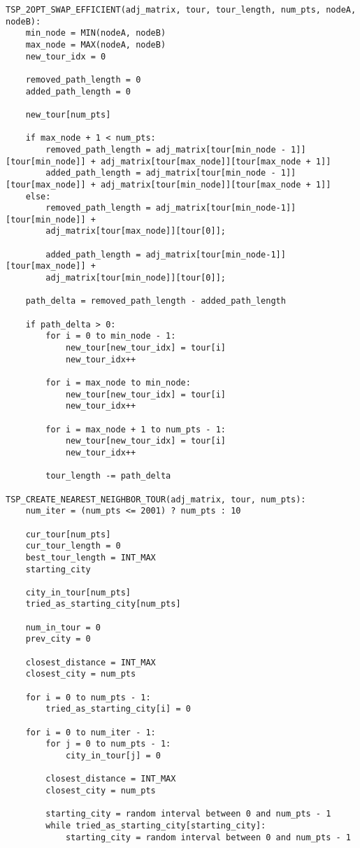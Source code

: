 \documentclass[../report/main.tex]{subfiles}
\begin{document}
\begin{verbatim}
TSP_2OPT_SWAP_EFFICIENT(adj_matrix, tour, tour_length, num_pts, nodeA, nodeB):
    min_node = MIN(nodeA, nodeB)
    max_node = MAX(nodeA, nodeB)
    new_tour_idx = 0

    removed_path_length = 0
    added_path_length = 0

    new_tour[num_pts]

    if max_node + 1 < num_pts:
        removed_path_length = adj_matrix[tour[min_node - 1]][tour[min_node]] + adj_matrix[tour[max_node]][tour[max_node + 1]]
        added_path_length = adj_matrix[tour[min_node - 1]][tour[max_node]] + adj_matrix[tour[min_node]][tour[max_node + 1]]
    else:
        removed_path_length = adj_matrix[tour[min_node-1]][tour[min_node]] + 
        adj_matrix[tour[max_node]][tour[0]];

        added_path_length = adj_matrix[tour[min_node-1]][tour[max_node]] + 
        adj_matrix[tour[min_node]][tour[0]];

    path_delta = removed_path_length - added_path_length

    if path_delta > 0:
        for i = 0 to min_node - 1:
            new_tour[new_tour_idx] = tour[i]
            new_tour_idx++

        for i = max_node to min_node:
            new_tour[new_tour_idx] = tour[i]
            new_tour_idx++

        for i = max_node + 1 to num_pts - 1:
            new_tour[new_tour_idx] = tour[i]
            new_tour_idx++

        tour_length -= path_delta

TSP_CREATE_NEAREST_NEIGHBOR_TOUR(adj_matrix, tour, num_pts):
    num_iter = (num_pts <= 2001) ? num_pts : 10

    cur_tour[num_pts]
    cur_tour_length = 0
    best_tour_length = INT_MAX
    starting_city

    city_in_tour[num_pts]
    tried_as_starting_city[num_pts]

    num_in_tour = 0
    prev_city = 0

    closest_distance = INT_MAX
    closest_city = num_pts

    for i = 0 to num_pts - 1:
        tried_as_starting_city[i] = 0

    for i = 0 to num_iter - 1:
        for j = 0 to num_pts - 1:
            city_in_tour[j] = 0

        closest_distance = INT_MAX
        closest_city = num_pts

        starting_city = random interval between 0 and num_pts - 1
        while tried_as_starting_city[starting_city]:
            starting_city = random interval between 0 and num_pts - 1


\end{verbatim}
\end{document}
